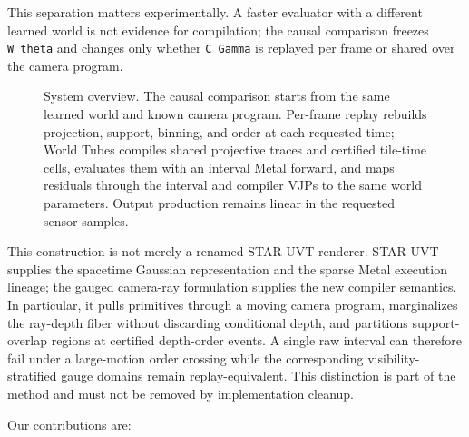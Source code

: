 \documentclass[
]{article}
\makeatletter
\newcommand*\pandocbounded[1]{%
  \sbox\pandoc@box{#1}%
  \Gscale@div\@tempa{\textheight}{\dimexpr\ht\pandoc@box+\dp\pandoc@box\relax}%
  \Gscale@div\@tempb{\linewidth}{\wd\pandoc@box}%
  \ifdim\@tempb\p@<\@tempa\p@\let\@tempa\@tempb\fi%
  \ifdim\@tempa\p@<\p@\scalebox{\@tempa}{\usebox\pandoc@box}%
  \else\usebox{\pandoc@box}%
  \fi%
}
\makeatother
\begin{document}
This separation matters experimentally. A faster evaluator with a
different learned world is not evidence for compilation; the causal
comparison freezes \texttt{W\_theta} and changes only whether
\texttt{C\_Gamma} is replayed per frame or shared over the camera
program.

\begin{figure}
\centering
\pandocbounded{}
\caption{System overview. The causal comparison starts from the same
learned world and known camera program. Per-frame replay rebuilds
projection, support, binning, and order at each requested time; World
Tubes compiles shared projective traces and certified tile-time cells,
evaluates them with an interval Metal forward, and maps residuals
through the interval and compiler VJPs to the same world parameters.
Output production remains linear in the requested sensor samples.}
\end{figure}

This construction is not merely a renamed STAR UVT renderer. STAR UVT
supplies the spacetime Gaussian representation and the sparse Metal
execution lineage; the gauged camera-ray formulation supplies the new
compiler semantics. In particular, it pulls primitives through a moving
camera program, marginalizes the ray-depth fiber without discarding
conditional depth, and partitions support-overlap regions at certified
depth-order events. A single raw interval can therefore fail under a
large-motion order crossing while the corresponding
visibility-stratified gauge domains remain replay-equivalent. This
distinction is part of the method and must not be removed by
implementation cleanup.

Our contributions are:
\end{document}
